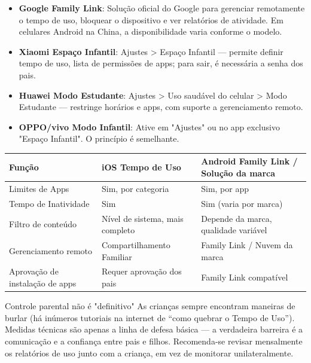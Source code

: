 
\begin{itemize}
  \item \textbf{Google Family Link}: Solução oficial do Google para gerenciar remotamente o tempo de uso, bloquear o dispositivo e ver relatórios de atividade. Em celulares Android na China, a disponibilidade varia conforme o modelo.
  \item \textbf{Xiaomi Espaço Infantil}: Ajustes > Espaço Infantil — permite definir tempo de uso, lista de permissões de apps; para sair, é necessária a senha dos pais.
  \item \textbf{Huawei Modo Estudante}: Ajustes > Uso saudável do celular > Modo Estudante — restringe horários e apps, com suporte a gerenciamento remoto.
  \item \textbf{OPPO/vivo Modo Infantil}: Ative em "Ajustes" ou no app exclusivo "Espaço Infantil". O princípio é semelhante.
\end{itemize}

\begin{center}
\begin{tabularx}{\linewidth}{|X|X|X|}
\hline
\textbf{Função} & \textbf{iOS Tempo de Uso} & \textbf{Android Family Link / Solução da marca} \tabularnewline
\hline
Limites de Apps & Sim, por categoria & Sim, por app \tabularnewline
Tempo de Inatividade & Sim & Sim (varia por marca) \tabularnewline
Filtro de conteúdo & Nível de sistema, mais completo & Depende da marca, qualidade variável \tabularnewline
Gerenciamento remoto & Compartilhamento Familiar & Family Link / Nuvem da marca \tabularnewline
Aprovação de instalação de apps & Requer aprovação dos pais & Family Link compatível \tabularnewline
\hline
\end{tabularx}
\end{center}

\begin{tcbwarn}{Controle parental não é "definitivo"}
As crianças sempre encontram maneiras de burlar (há inúmeros tutoriais na internet de “como quebrar o Tempo de Uso”). Medidas técnicas são apenas a linha de defesa básica — a verdadeira barreira é a comunicação e a confiança entre pais e filhos. Recomenda-se revisar mensalmente os relatórios de uso junto com a criança, em vez de monitorar unilateralmente.

\end{tcbwarn}


